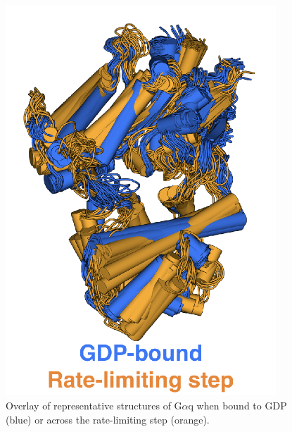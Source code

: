 \documentclass[../main.tex]{subfiles}
\begin{document}
    \begin{figure}[!htb] %
        \centering
        \includegraphics[width=4in]{ch4-fig2-supp2.png}
        \caption[Overlay of representative structures of G$\alpha$q when bound to GDP (blue) or across the rate-limiting step (orange).]
            {Overlay of representative structures of G$\alpha$q when bound to GDP (blue) or across the rate-limiting step (orange).}
        \label{fig:ch4-fig2-supp2}
    \end{figure}
\end{document}
